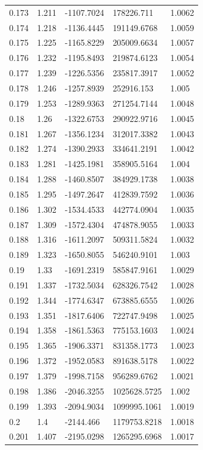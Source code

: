 \begin{tabular}{lllll}
0.173 & 1.211 & -1107.7024 & 178226.711 & 1.0062 \\
0.174 & 1.218 & -1136.4445 & 191149.6768 & 1.0059 \\
0.175 & 1.225 & -1165.8229 & 205009.6634 & 1.0057 \\
0.176 & 1.232 & -1195.8493 & 219874.6123 & 1.0054 \\
0.177 & 1.239 & -1226.5356 & 235817.3917 & 1.0052 \\
0.178 & 1.246 & -1257.8939 & 252916.153 & 1.005 \\
0.179 & 1.253 & -1289.9363 & 271254.7144 & 1.0048 \\
0.18 & 1.26 & -1322.6753 & 290922.9716 & 1.0045 \\
0.181 & 1.267 & -1356.1234 & 312017.3382 & 1.0043 \\
0.182 & 1.274 & -1390.2933 & 334641.2191 & 1.0042 \\
0.183 & 1.281 & -1425.1981 & 358905.5164 & 1.004 \\
0.184 & 1.288 & -1460.8507 & 384929.1738 & 1.0038 \\
0.185 & 1.295 & -1497.2647 & 412839.7592 & 1.0036 \\
0.186 & 1.302 & -1534.4533 & 442774.0904 & 1.0035 \\
0.187 & 1.309 & -1572.4304 & 474878.9055 & 1.0033 \\
0.188 & 1.316 & -1611.2097 & 509311.5824 & 1.0032 \\
0.189 & 1.323 & -1650.8055 & 546240.9101 & 1.003 \\
0.19 & 1.33 & -1691.2319 & 585847.9161 & 1.0029 \\
0.191 & 1.337 & -1732.5034 & 628326.7542 & 1.0028 \\
0.192 & 1.344 & -1774.6347 & 673885.6555 & 1.0026 \\
0.193 & 1.351 & -1817.6406 & 722747.9498 & 1.0025 \\
0.194 & 1.358 & -1861.5363 & 775153.1603 & 1.0024 \\
0.195 & 1.365 & -1906.3371 & 831358.1773 & 1.0023 \\
0.196 & 1.372 & -1952.0583 & 891638.5178 & 1.0022 \\
0.197 & 1.379 & -1998.7158 & 956289.6762 & 1.0021 \\
0.198 & 1.386 & -2046.3255 & 1025628.5725 & 1.002 \\
0.199 & 1.393 & -2094.9034 & 1099995.1061 & 1.0019 \\
0.2 & 1.4 & -2144.466 & 1179753.8218 & 1.0018 \\
0.201 & 1.407 & -2195.0298 & 1265295.6968 & 1.0017 \\

\end{tabular}
